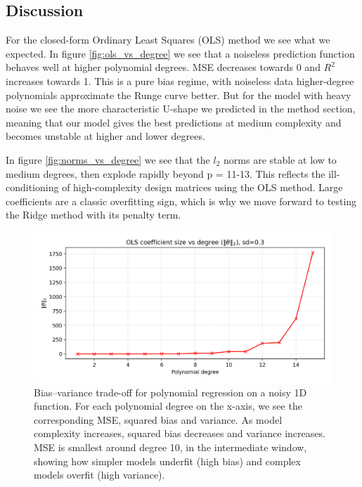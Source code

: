 \documentclass[amssymb,twocolumn,aps]{revtex4}
\begin{document}
\subsection{Discussion}

For the closed-form Ordinary Least Squares (OLS) method we see what we expected. In figure \ref{fig:ols_vs_degree} we see that a noiseless prediction function behaves well at higher polynomial degrees. MSE decreases towards 0 and $R^2$ increases towards 1. This is a pure bias regime, with noiseless data higher-degree polynomials approximate the Runge curve better. But for the model with heavy noise we see the more characteristic U-shape we predicted in the method section, meaning that our model gives the best predictions at medium complexity and becomes unstable at higher and lower degrees.

In figure \ref{fig:norms_vs_degree} we see that the $l_2$ norms are stable at low to medium degrees, then explode rapidly beyond p = 11-13. This reflects the ill-conditioning of high-complexity design matrices using the OLS method. Large coefficients are a classic overfitting sign, which is why we move forward to testing the Ridge method with its penalty term. 


\begin{figure}[h]
    \centering
    \includegraphics[width=1\linewidth]{Project-1/Figures/runge_ols_theta_norms_vs_degree.png}
    \caption{Bias–variance trade-off for polynomial regression on a noisy 1D function. For each polynomial degree on the x-axis, we see the corresponding MSE, squared bias and variance. As model complexity increases, squared bias decreases and variance increases. MSE is smallest around degree 10, in the intermediate window, showing how simpler models underfit (high bias) and complex models overfit (high variance).}
    \label{fig:biasvariance}
\end{figure}
\end{document}
